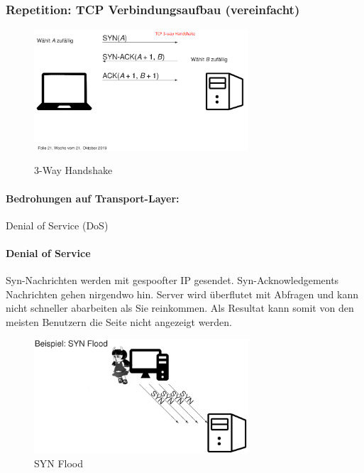 \documentclass[10pt,a4paper]{article}
\begin{document}
\subsubsection*{Repetition: TCP Verbindungsaufbau (vereinfacht)}
\begin{figure}[H]
    \begin{center}
    \includegraphics[width=8cm]{images/Repetition_3_way_handshake.png}
    \caption{3-Way Handshake}
    \label{3-Way Handshake}
    \end{center}
\end{figure}


\paragraph*{Bedrohungen auf Transport-Layer:} Denial of Service (DoS)
\paragraph*{Denial of Service}Syn-Nachrichten werden mit gespoofter IP gesendet. Syn-Acknowledgements Nachrichten gehen nirgendwo hin.
Server wird überflutet mit Abfragen und kann nicht schneller abarbeiten als Sie reinkommen.
Als Resultat kann somit von den meisten Benutzern die Seite nicht angezeigt werden.
\begin{figure}[H]
    \begin{center}
    \includegraphics[width=8cm]{images/Syn-flood.png}
    \caption{SYN Flood}
    \label{Syn Flood}
    \end{center}
\end{figure}
\end{document}
